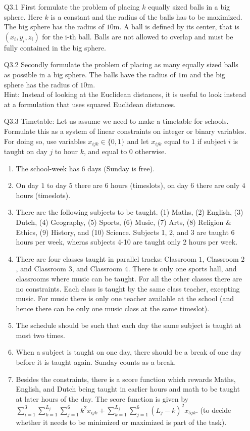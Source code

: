 \documentclass{article}
\newcommand{\mrm}[1]{\mathrm{#1}}
\begin{document}
\begin{itemize}
\item[Q3.1] First formulate the problem of placing $k$ equally sized balls in a big sphere. Here $k$ is a constant and the radius of the balls has to be maximized. The big sphere has the radius of $10\mrm{m}$. A ball is defined by its center, that is $(x_i, y_i, z_i)$ for the i-th ball. Balls are not allowed to overlap and must be fully contained in the big sphere.
\item[Q3.2] Secondly formulate the problem of placing as many equally sized balls as possible in a big sphere.  The balls have the radius of $1 \mrm{m}$ and
the big sphere has the radius of $10\mrm{m}$.\\ 
Hint: Instead of looking at the Euclidean distances, it is useful to look instead at a formulation that uses squared Euclidean distances.
\item[Q3.3] Timetable: 
Let us assume we need to make a timetable for schools. Formulate this as a system of linear constraints on integer or binary variables. For doing so, use variables $x_{ijk} \in \{0,1\}$ and let $x_{ijk}$ equal to $1$ if subject $i$ is taught on day $j$ to hour $k$, and equal to $0$ otherwise.
\begin{enumerate}
	\item The school-week has $6$ days (Sunday is free).
	\item On day $1$ to day $5$ there are $6$ hours (timeslots), on day $6$ there are only $4$ hours (timeslots).
	\item There are the following subjects to be taught. (1) Maths, (2) English, (3) Dutch, (4) Geography, (5) Sports, (6) Music, (7) Arts, (8) Religion \& Ethics, (9) History, and (10) Science. Subjects 1, 2, and 3 are taught 6 hours per week, wheras subjects 4-10 are taught only 2 hours per week.
	\item There are four classes taught in parallel tracks: Classroom $1$, Classroom $2$, and Classroom $3$, and Classroom $4$. There is only one sports hall, and classrooms where music can be taught. For all the other classes there are no constraints. Each class is taught by the same class teacher, excepting music. For music there is only one teacher available at the school (and hence there can be only one music class at the same timeslot).
	\item The schedule should be such that each day the same subject is taught at most two times.  
	\item When a subject is taught on one day, there should be a break of one day before it is taught again. Sunday counts as a break.
	\item Besides the constraints, there is a score function which rewards Maths, English, and Dutch  being taught in earlier hours and math to be taught at later hours of the day. The score function is given by $\sum_{i=1}^3\sum_{k=1}^{L_j} \sum_{j=1}^6 k^2 x_{ijk} + \sum_{k=1}^{L_j} \sum_{j=1}^6 (L_j-k)^2 x_{5jk}$. (to decide whether it needs to be minimized or maximized is part of the task).
\end{enumerate}
\end{itemize}
\end{document}

